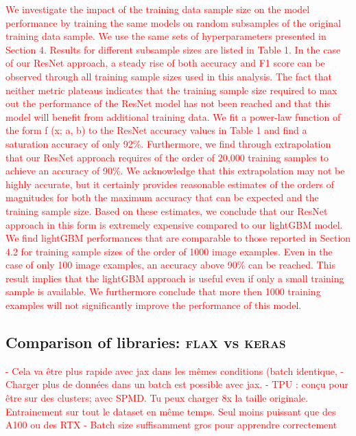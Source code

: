 \documentclass[amt, article]{copernicus}
\begin{document}
\textcolor{red}{We investigate the impact of the training data sample size on
the model performance by training the same models on random
subsamples of the original training data sample. We use the
same sets of hyperparameters presented in Section 4. Results
for different subsample sizes are listed in Table 1.
In the case of our ResNet approach, a steady rise of both
accuracy and F1 score can be observed through all training
sample sizes used in this analysis. The fact that neither metric
plateaus indicates that the training sample size required to max
out the performance of the ResNet model has not been reached
and that this model will benefit from additional training data.
We fit a power-law function of the form f (x; a, b) to the ResNet accuracy values in Table 1
and find a saturation accuracy of only 92\%. Furthermore, we
find through extrapolation that our ResNet approach requires of
the order of 20,000 training samples to achieve an accuracy of
90\%. We acknowledge that this extrapolation may not be highly accurate, but it certainly provides reasonable estimates
of the orders of magnitudes for both the maximum accuracy
that can be expected and the training sample size. Based on
these estimates, we conclude that our ResNet approach in this
form is extremely expensive compared to our lightGBM model.
We find lightGBM performances that are comparable to
those reported in Section 4.2 for training sample sizes of the
order of 1000 image examples. Even in the case of only 100
image examples, an accuracy above 90\% can be reached. This
result implies that the lightGBM approach is useful even if only
a small training sample is available. We furthermore conclude
that more then 1000 training examples will not significantly
improve the performance of this model.}


\subsection{Comparison of libraries: \textsc{flax} vs \textsc{keras}}

\textcolor{red}{
    - Cela va être plus rapide avec jax dans les mêmes conditions (batch identique, 
    - Charger plus de données dans un batch est possible avec jax.
    - TPU : conçu pour être sur des clusters; avec SPMD.
    Tu peux charger 8x la taille originale. Entrainement sur tout le dataset en même temps.
    Seul moins puissant que des A100 ou des RTX
    - Batch size suffisamment gros pour apprendre correctement
}
\end{document}
